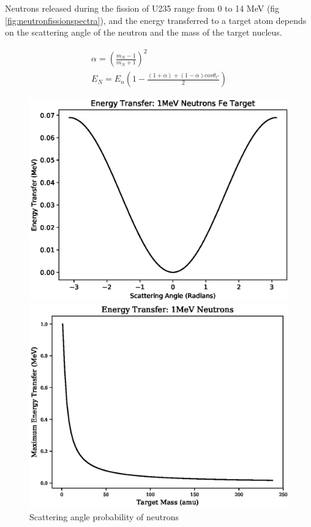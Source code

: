 Neutrons released during the fission of U235 range from 0 to 14 MeV (fig \ref{fig:neutronfissionspectra}), and the energy transferred to a target atom depends on the scattering angle of the neutron and the mass of the target nucleus.  

\begin{equation}
\begin{split}
\alpha = (\frac{m_N-1}{m_N+1})^2 \\
E_N = E_n \left(1 - \frac{(1+\alpha) + (1 - \alpha) cos \theta_C}{2}\right)
\end{split}
\label{eq:eqNeutronEnergyTransfer}
\end{equation}

\begin{figure}
\centering
\begin{minipage}{.46\textwidth}
\centering
\includegraphics[width=.9\linewidth]{chapters/background_austenitic_steels_in_nuclear/plots/scattering_angle.eps}
\caption{Scattering angle probability of neutrons}
\label{fig:scatteringangle}
\end{minipage}
\begin{minipage}{.05\textwidth}
\end{minipage}
\begin{minipage}{.46\textwidth}
\centering
\includegraphics[width=.9\linewidth]{chapters/background_austenitic_steels_in_nuclear/plots/nuclei_mass.eps}

\end{minipage}
\end{figure}
